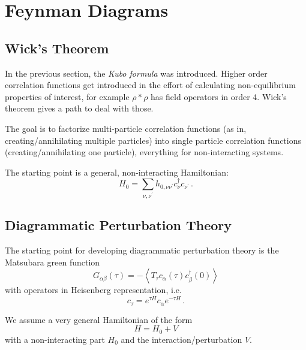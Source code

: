 \documentclass[../classnotes.tex]{subfiles}
\begin{document}
\chapter{Feynman Diagrams}

\section{Wick's Theorem}

In the previous section, the \emph{Kubo formula} was introduced.
Higher order correlation functions get introduced in the effort of calculating non-equilibrium properties of interest, for example \(\rho * \rho\) has field operators in order 4.
Wick's theorem gives a path to deal with those.

The goal is to factorize multi-particle correlation functions (as in, creating/annihilating multiple particles) into single particle correlation functions (creating/annihilating one particle), everything for non-interacting systems.

The starting point is a general, non-interacting Hamiltonian:
\begin{equation}
    H_0 = \sum_{\nu, \nu^{\prime}} h_{0, \nu \nu^{\prime}} c_{\nu}^{\dagger} c_{\nu^{\prime}}\,.
\end{equation}

\section{Diagrammatic Perturbation Theory}

The starting point for developing diagrammatic perturbation theory is the Matsubara green function
\begin{equation}
    G_{\alpha \beta} (\tau) = - \left< T_{\tau} c_{\alpha} (\tau) c_{\beta}^{\dagger} (0) \right>
\end{equation}
with operators in Heisenberg representation, i.e.
\begin{equation}
    c_{\tau} = e^{\tau H} c_{\alpha} e^{-\tau H}\,.
\end{equation}

We assume a very general Hamiltonian of the form
\begin{equation}
    H = H_0 + V
\end{equation}
with a non-interacting part \(H_0\) and the interaction/perturbation \(V\).
\end{document}
